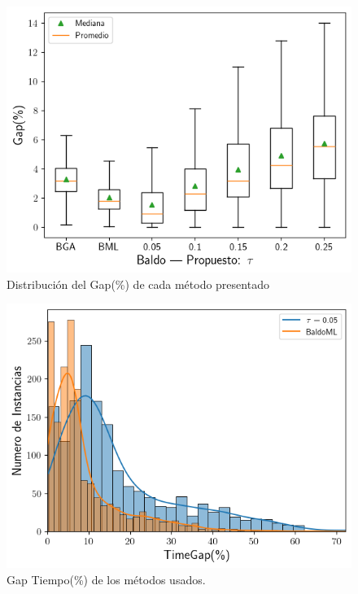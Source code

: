 \documentclass[spanish, a4paper, 12pt, openany,final]{book}
\begin{document}
\begin{figure}[H]
	\centering
	\includegraphics[scale=0.7]{graphs/full_gap_comparison.png}
	\caption{Distribución del Gap(\%) de cada método presentado}
	\label{fig:full_gap}
\end{figure}

\begin{figure}[H]
	\centering
	\includegraphics[scale=0.7]{graphs/full_timegap_comparison.png}
	\caption{Gap Tiempo(\%) de los métodos usados.}
	\label{fig:full_timegap}
\end{figure}
\end{document}
